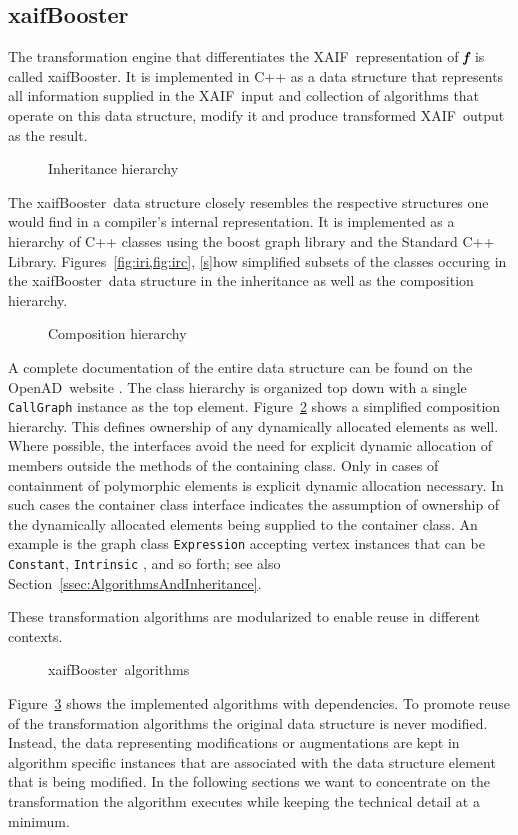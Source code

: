 \documentclass[acmtocl,acmnow]{acmtrans2m}
\newcommand{\OpenAD}{OpenAD}
\newcommand{\xaif}{XAIF}
\newcommand{\xaifBooster}{xaifBooster}
\newcommand{\bmf}{\mbox{\bf\em f}}
\newcommand{\code}[1]{{\small\tt{#1}}}
\newcommand{\reffig}[1]{Figure~\ref{#1}}
\newcommand{\reffigs}[2]{Figures~\ref{#1}, \ref{#2}}
\newcommand{\refsec}[1]{Section~\ref{#1}}
\begin{document}
\subsection{\xaifBooster} 
The transformation engine that differentiates the \xaif\ representation of 
$\bmf$ is called \xaifBooster. It is implemented in C++ as a 
data structure that represents all information supplied in the \xaif\ input 
and collection of algorithms that operate on this data structure, modify 
it and produce transformed  \xaif\ output as the result. 

\begin{figure}
\centering {}
\caption{Inheritance hierarchy} \label{fig:iri}
\end{figure}

The \xaifBooster\ data structure  
closely resembles the respective structures one would find in a 
compiler's internal representation. 
It is implemented as a hierarchy of C++ classes 
using the boost graph library \cite{boostWeb}
and the Standard C++ Library\cite{libstdcWeb}.
\reffigs{fig:iri,fig:irc} show simplified subsets of the classes 
occuring in the \xaifBooster\ data structure in the inheritance 
as well as the composition hierarchy.  
\begin{figure}[htb]
\centering {}
\caption{Composition hierarchy} \label{fig:irc}
\end{figure}

A complete documentation of the entire data structure 
can be found on the \OpenAD\ website \cite{openadWeb}.
The class hierarchy is organized top down with 
a single \code{CallGraph} instance as the top element. 
\reffig{fig:irc} shows  a simplified composition hierarchy.
This defines ownership of any dynamically allocated elements as well. Where possible,
the interfaces avoid the need for explicit dynamic allocation of members outside the methods of the 
containing class. Only in cases of containment of polymorphic elements is explicit dynamic allocation 
necessary. In such cases the container class interface indicates the assumption of ownership of 
the dynamically allocated elements being supplied to the container class. An example is the 
graph class \code{Expression} accepting vertex instances that can be \code{Constant}, \code{Intrinsic} , and so forth; 
see also \refsec{ssec:AlgorithmsAndInheritance}.

These transformation algorithms are modularized to enable reuse in different 
contexts. 
\begin{figure}
\centering {}
\caption{\xaifBooster\ algorithms} \label{fig:allAlgs}
\end{figure}
\reffig{fig:allAlgs} shows the implemented algorithms with dependencies.
To promote reuse of the transformation algorithms the original data structure 
is never modified. Instead, the data representing modifications or augmentations
are kept in algorithm specific instances that are associated with the 
data structure element that is being modified. 
In the following sections we want to concentrate on the transformation 
the algorithm executes while keeping the technical detail at a minimum. 
\end{document}
